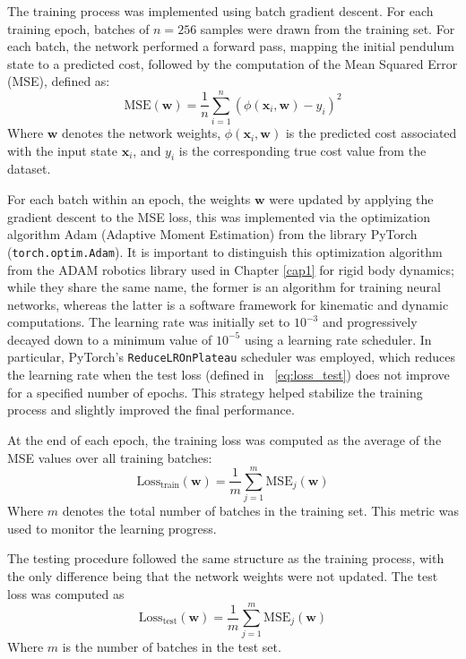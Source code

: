 \noindent The training process was implemented using batch gradient descent. For each training epoch, batches of $n = 256$ samples were drawn from the training set. For each batch, the network performed a forward pass, mapping the initial pendulum state to a predicted cost, followed by the computation of the Mean Squared Error (MSE), defined as:
\begin{equation}
    \text{MSE}(\mathbf{w}) = \frac{1}{n} \sum_{i=1}^{n} \left( \phi(\mathbf{x}_i, \mathbf{w}) - y_i \right)^2
\end{equation}
\noindent Where $\mathbf{w}$ denotes the network weights, $\phi(\mathbf{x}_i, \mathbf{w})$ is the predicted cost associated with the input state $\mathbf{x}_i$, and $y_i$ is the corresponding true cost value from the dataset.

\noindent For each batch within an epoch, the weights $\mathbf{w}$ were updated by applying the gradient descent to the MSE loss, this was implemented via the optimization algorithm Adam (Adaptive Moment Estimation) from the library PyTorch (\texttt{torch.optim.Adam}). It is important to distinguish this optimization algorithm from the ADAM robotics library used in Chapter \ref{cap1} for rigid body dynamics; while they share the same name, the former is an algorithm for training neural networks, whereas the latter is a software framework for kinematic and dynamic computations. The learning rate was initially set to $10^{-3}$ and progressively decayed down to a minimum value of $10^{-5}$ using a learning rate scheduler. In particular, PyTorch's \texttt{ReduceLROnPlateau} scheduler was employed, which reduces the learning rate when the test loss (defined in ~\eqref{eq:loss_test}) does not improve for a specified number of epochs. This strategy helped stabilize the training process and slightly improved the final performance.

\noindent At the end of each epoch, the training loss was computed as the average of the MSE values over all training batches:
\begin{equation}
    \text{Loss}_{\text{train}}(\mathbf{w}) = \frac{1}{m} \sum_{j=1}^{m} \text{MSE}_j(\mathbf{w})
\end{equation}
\noindent Where $m$ denotes the total number of batches in the training set. This metric was used to monitor the learning progress.

\noindent The testing procedure followed the same structure as the training process, with the only difference being that the network weights were not updated. The test loss was computed as
\begin{equation}
    \label{eq:loss_test}
    \text{Loss}_{\text{test}}(\mathbf{w}) = \frac{1}{m} \sum_{j=1}^{m} \text{MSE}_j(\mathbf{w})
\end{equation}
\noindent Where $m$ is the number of batches in the test set.

